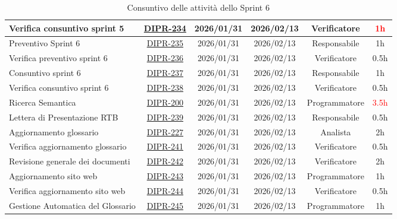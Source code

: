 \documentclass[a4paper,12pt]{article}
\begin{document}
\begin{table}[H]
\begin{adjustwidth}{-4cm}{-4cm}
\begin{spacing}{1}
\begin{tabular}{|p{4cm}|c|c|c|c|c|}
        \hline
        Verifica consuntivo sprint 5 & \href{https://7zpus.atlassian.net/browse/DIPR-234}{DIPR-234} & 2026/01/31 & 2026/02/13 & Verificatore & \textcolor{red}{1h} \\
        \hline
        Preventivo Sprint 6 & \href{https://7zpus.atlassian.net/browse/DIPR-235}{DIPR-235} & 2026/01/31 & 2026/02/13 & Responsabile & 1h \\
        \hline
        Verifica preventivo sprint 6 & \href{https://7zpus.atlassian.net/browse/DIPR-236}{DIPR-236} & 2026/01/31 & 2026/02/13 & Verificatore & 0.5h \\
        \hline
        Consuntivo sprint 6 & \href{https://7zpus.atlassian.net/browse/DIPR-237}{DIPR-237} & 2026/01/31 & 2026/02/13 & Responsabile & 1h \\
        \hline
        Verifica consuntivo sprint 6 & \href{https://7zpus.atlassian.net/browse/DIPR-238}{DIPR-238} & 2026/01/31 & 2026/02/13 & Verificatore & 0.5h \\
        \hline
        Ricerca Semantica & \href{https://7zpus.atlassian.net/browse/DIPR-200}{DIPR-200} & 2026/01/31 & 2026/02/13 & Programmatore & \textcolor{red}{3.5h} \\
        \hline
        Lettera di Presentazione RTB & \href{https://7zpus.atlassian.net/browse/DIPR-239}{DIPR-239} & 2026/01/31 & 2026/02/13 & Responsabile & 0.5h \\
        \hline
        Aggiornamento glossario & \href{https://7zpus.atlassian.net/browse/DIPR-227}{DIPR-227} & 2026/01/31 & 2026/02/13 & Analista & 2h \\
        \hline
        Verifica aggiornamento glossario & \href{https://7zpus.atlassian.net/browse/DIPR-241}{DIPR-241} & 2026/01/31 & 2026/02/13 & Verificatore & 0.5h \\
        \hline
        Revisione generale dei documenti & \href{https://7zpus.atlassian.net/browse/DIPR-242}{DIPR-242} & 2026/01/31 & 2026/02/13 & Verificatore & 2h \\
        \hline
        Aggiornamento sito web & \href{https://7zpus.atlassian.net/browse/DIPR-243}{DIPR-243} & 2026/01/31 & 2026/02/13 & Programmatore & 1h \\
        \hline
        Verifica aggiornamento sito web & \href{https://7zpus.atlassian.net/browse/DIPR-244}{DIPR-244} & 2026/01/31 & 2026/02/13 & Verificatore & 0.5h \\
        \hline
        Gestione Automatica del Glossario & \href{https://7zpus.atlassian.net/browse/DIPR-245}{DIPR-245} & 2026/01/31 & 2026/02/13 & Programmatore & 1h \\
        \hline
    \end{tabular}
    \end{spacing}
    \caption{Consuntivo delle attività dello Sprint 6}
    \end{adjustwidth}
\end{table}
\end{document}
